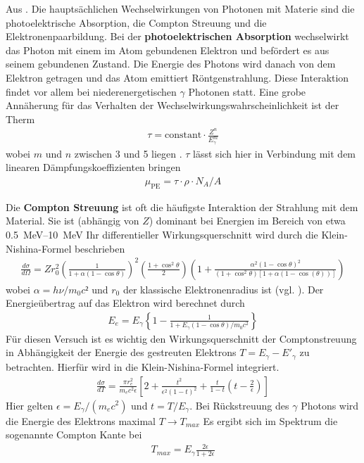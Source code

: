 Aus \cite{book:gil}. Die hauptsächlichen Wechselwirkungen von Photonen mit
Materie sind die photoelektrische Absorption, die Compton Streuung und die
Elektronenpaarbildung. Bei der \textbf{photoelektrischen Absorption}
wechselwirkt das Photon mit einem im Atom gebundenen Elektron und befördert es
aus seinem gebundenen Zustand. Die Energie des Photons wird danach von dem
Elektron getragen und das Atom emittiert Röntgenstrahlung. Diese Interaktion
findet vor allem bei niederenergetischen $\gamma$ Photonen statt. Eine grobe
Annäherung für das Verhalten der Wechselwirkungswahrscheinlichkeit ist der
Therm
\begin{align}
	\tau = \text{constant} \cdot \frac{Z^n}{E_{\gamma}^{m}}
\end{align} %
wobei $m$ und $n$ zwischen 3 und 5 liegen \cite[vgl.][Kap 2.2.1]{book:gil}.
$\tau$ lässt sich hier in Verbindung mit dem linearen Dämpfungskoeffizienten bringen
\begin{align}
	\mu_{\text{PE}} = \tau \cdot \rho \cdot N_A /A
\end{align}

Die \textbf{Compton Streuung} ist oft die häufigste Interaktion der Strahlung
mit dem Material. Sie ist (abhängig von $Z$) dominant bei Energien im Bereich
von etwa \qtyrange{0.5}{10}{\MeV} Ihr differentieller Wirkungsquerschnitt wird
durch die Klein-Nishina-Formel beschrieben
\begin{align}
	\frac{d\sigma}{d \Omega} = Z r_0^2 \left(\frac{1}{1+\alpha(1-\cos\theta)}\right)^2 %
	\left(\frac{1+ \cos^2\theta}{2}\right)%
	\left(1+ \frac{\alpha^2(1-\cos \theta)^2}{(1+\cos^2 \theta)[1+\alpha(1-\cos(\theta))]}\right)
	\label{eq:wq_compton}
\end{align}%
wobei $\alpha = h \nu / m_0 c²$ und $r_0$ der klassische Elektronenradius ist (vgl. \cite{book:knoll}).%
Der Energieübertrag auf das Elektron wird berechnet durch
\begin{align}
	E_{e} = E_{\gamma} \left\{1- \frac{1}{1+ E_{\gamma}(1-\cos\theta)/m_0 c^2} \right\}
	\label{eq:ecompton}
\end{align}
Für diesen Versuch ist es wichtig den Wirkungsquerschnitt der Comptonstreuung in Abhängigkeit der
Energie des gestreuten Elektrons $T = E_{\gamma} - E'_{\gamma}$ zu betrachten.
Hierfür wird in \cite[][Kap. 3.5.3]{book:kolano} die Klein-Nishina-Formel integriert.
\begin{align}
	\frac{d \sigma}{d T} =  \frac{\pi r_{e}^{2}}{m_e c^2 \epsilon}%
	\left[2 + \frac{t^2}{\epsilon^2(1-t)^2} + \frac{t}{1-t} %
		\left(t - \frac{2}{\epsilon} \right) \right]
	\label{eq:compton_energie}
\end{align}
Hier gelten $\epsilon = E_{\gamma} / (m_e c^2)$ und $t = T/ E_\gamma$.
Bei Rückstreuung des $\gamma$ Photons wird die Energie des Elektrons maximal
$T \rightarrow T_{max}$
Es ergibt sich im Spektrum die sogenannte Compton Kante bei
\begin{align}
	T_{max}= E_\gamma \frac{2\epsilon}{1+2\epsilon}
\end{align}

